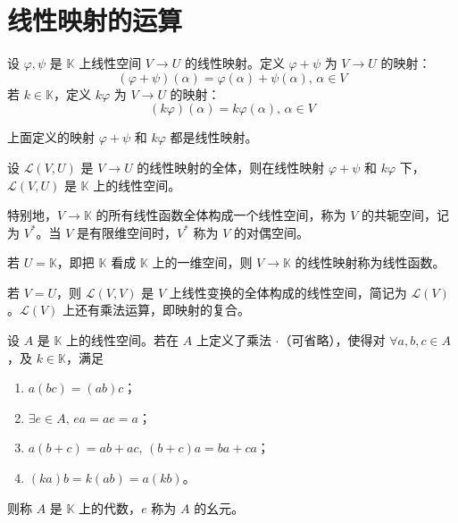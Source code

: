 
\section{线性映射的运算}

\begin{definition}
  设 $\varphi,\psi$ 是 $\mathbb{K}$ 上线性空间 $V \to U$ 的线性映射。定义 $\varphi + \psi$ 为 $V \to U$ 的映射：
  \[(\varphi + \psi)(\alpha) = \varphi(\alpha) + \psi(\alpha),\, \alpha \in  V\]
  若 $k \in \mathbb{K}$，定义 $k\varphi$ 为 $V \to U$ 的映射：
  \[(k\varphi)(\alpha) = k\varphi(\alpha),\, \alpha \in V\]
\end{definition}

\begin{proposition}
  上面定义的映射 $\varphi + \psi$ 和 $k\varphi$ 都是线性映射。
\end{proposition}

\begin{proposition}
  设 $\mathcal{L}(V,U)$ 是 $V \to U$ 的线性映射的全体，则在线性映射 $\varphi + \psi$ 和 $k\varphi$ 下，$\mathcal{L}(V,U)$ 是 $\mathbb{K}$ 上的线性空间。

  特别地，$V \to \mathbb{K}$ 的所有线性函数全体构成一个线性空间，称为 $V$ 的共轭空间，记为 $V^*$。当 $V$ 是有限维空间时，$V^*$ 称为 $V$ 的对偶空间。
\end{proposition}

\begin{remark}
  若 $U = \mathbb{K}$，即把 $\mathbb{K}$ 看成 $\mathbb{K}$ 上的一维空间，则 $V \to \mathbb{K}$ 的线性映射称为线性函数。
\end{remark}

\begin{remark}
  若 $V = U$，则 $\mathcal{L}(V,V)$ 是 $V$ 上线性变换的全体构成的线性空间，简记为 $\mathcal{L}(V)$。$\mathcal{L}(V)$ 上还有乘法运算，即映射的复合。
\end{remark}

\begin{definition}
  设 $A$ 是 $\mathbb{K}$ 上的线性空间。若在 $A$ 上定义了乘法 $\cdot$（可省略），使得对 $\forall a,b,c \in A$，及 $k \in \mathbb{K}$，满足
  \begin{enumerate}
    \item $a(bc) = (ab)c$；
    \item $\exists e \in A,\, ea = ae = a$；
    \item $a(b + c) = ab + ac,\, (b + c)a = ba + ca$；
    \item $(ka)b = k(ab) = a(kb)$。
  \end{enumerate}
  则称 $A$ 是 $\mathbb{K}$ 上的代数，$e$ 称为 $A$ 的幺元。
\end{definition}

